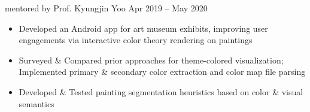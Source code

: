 {    %
        {{\bodyfontsize \color{body} mentored by} Prof. Kyungjin Yoo}%
        {Apr 2019 -- May 2020}
        {}{}%
    \begin{itemize}%
        \item Developed an  Android app
        for art museum exhibits, improving user engagements via interactive color theory rendering on paintings%
        \item Surveyed \& Compared prior approaches for theme-colored visualization; Implemented primary \& secondary color extraction and color map file parsing%
        \item Developed \& Tested painting segmentation heuristics based on color \& visual semantics%
    \end{itemize}%
    \dividerSmall
}%
%